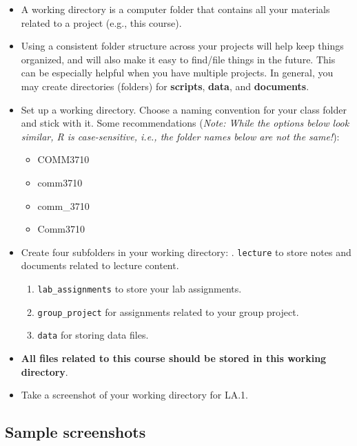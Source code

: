 \documentclass[
]{article}
\providecommand{\tightlist}{%
  \setlength{\itemsep}{0pt}\setlength{\parskip}{0pt}}
\begin{document}
\begin{itemize}
\tightlist
\item
  A working directory is a computer folder that contains all your
  materials related to a project (e.g., this course).
\item
  Using a consistent folder structure across your projects will help
  keep things organized, and will also make it easy to find/file things
  in the future. This can be especially helpful when you have multiple
  projects. In general, you may create directories (folders) for
  \textbf{scripts}, \textbf{data}, and \textbf{documents}.
\item
  Set up a working directory. Choose a naming convention for your class
  folder and stick with it. Some recommendations (\emph{Note: While the
  options below look similar, R is case-sensitive, i.e., the folder
  names below are not the same!}):

  \begin{itemize}
  \tightlist
  \item
    COMM3710
  \item
    comm3710
  \item
    comm\_3710
  \item
    Comm3710
  \end{itemize}
\item
  Create four subfolders in your working directory: . \texttt{lecture} to store notes and documents related to lecture
  content.

  \begin{enumerate}
  \def\labelenumi{\arabic{enumi}.}
  \setcounter{enumi}{1}
  \tightlist
  \item
    \texttt{lab\_assignments} to store your lab assignments.
  \item
    \texttt{group\_project} for assignments related to your group
    project.
  \item
    \texttt{data} for storing data files.
  \end{enumerate}
\item
  \textbf{All files related to this course should be stored in this
  working directory}.
\item
  Take a screenshot of your working directory for LA.1.
\end{itemize}

\hypertarget{sample-screenshots}{%
\subsection{Sample screenshots}\label{sample-screenshots}}
\end{document}
